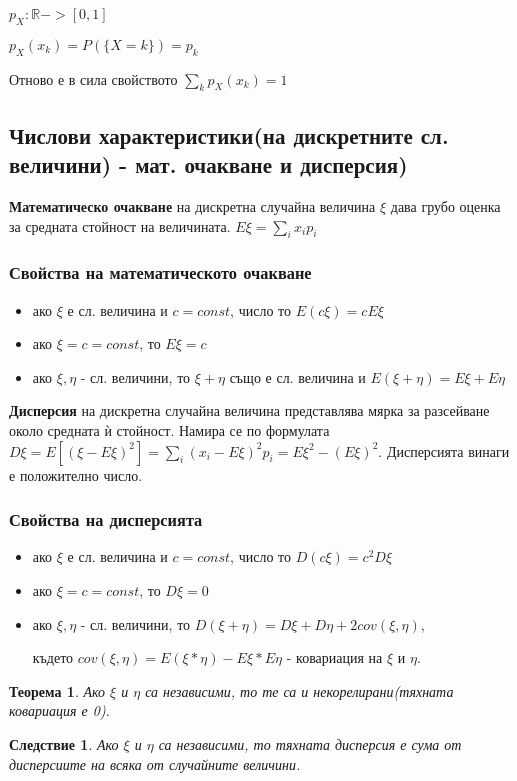 \documentclass[fleqn,12pt]{article}
\newtheorem*{Th}{Теорема}
\newtheorem*{Corollary}{Следствие}
\begin{document}
\begin{justify}
$p_X : \mathbb{R} -> [0, 1]$

$p_X(x_k) = P(\{X=k\}) = p_k$

Отново е в сила свойството $\sum_k p_X(x_k) = 1$

\subsection{Числови характеристики(на дискретните сл. величини) - мат. очакване и дисперсия)}
\textbf{Математическо очакване} на дискретна случайна величина $\xi$ дава грубо оценка за средната стойност на
величината. $E\xi = \sum_i x_i p_i$

\subsubsection{Свойства на математическото очакване}
\begin{itemize}
    \item ако $\xi$ е сл. величина  и $c=const$, число то $E(c\xi) = cE\xi$
    \item ако $\xi = c = const$, то $E\xi = c$
    \item ако $\xi, \eta$ - сл. величини, то $\xi + \eta$ също е сл. величина и $E\left( \xi + \eta \right) = E\xi +
    E\eta$
\end{itemize}

\textbf{Дисперсия} на дискретна случайна величина представлява мярка за разсейване около средната ѝ стойност. Намира се
по формулата $D\xi = E[\left(\xi - E\xi\right)^2] = \sum_i (x_i - E\xi)^2 p_i = E\xi^2 - (E\xi)^2$. Дисперсията винаги е
положително число.

\subsubsection{Свойства на дисперсията}
\begin{itemize}
    \item ако $\xi$ е сл. величина  и $c=const$, число то $D\left( c\xi \right) = c^2 D\xi$
    \item ако $\xi = c = const$, то $D\xi = 0$
    \item ако $\xi, \eta$ - сл. величини, то  $D(\xi + \eta) = D\xi + D\eta + 2cov(\xi, \eta)$, 

    където $cov(\xi, \eta) = E\left( \xi*\eta \right) - E\xi * E\eta$ - ковариация на $\xi$ и $\eta$.
\end{itemize}

\begin{Th}
    Ако $\xi$ и $\eta$ са независими, то те са и некорелирани(тяхната ковариация е 0).
\end{Th}
\begin{Corollary}
    Ако $\xi$ и $\eta$ са независими, то тяхната дисперсия е сума от дисперсиите на всяка от случайните величини.


\end{Corollary}
\end{justify}
\end{document}
